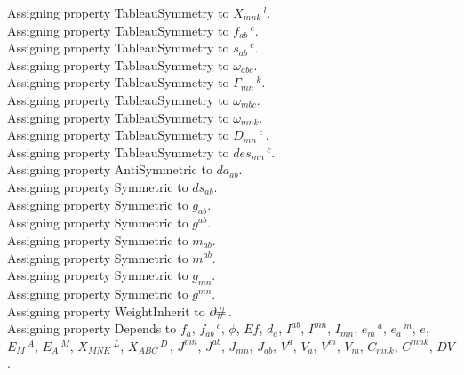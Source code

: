 \documentclass[11pt]{article}
\begin{document}
Assigning property TableauSymmetry to ${X}_{m n k}\,^{l}$.
\\
Assigning property TableauSymmetry to ${f}_{a b}\,^{c}$.
\\
Assigning property TableauSymmetry to ${s}_{a b}\,^{c}$.
\\
Assigning property TableauSymmetry to ${\omega}_{a b c}$.
\\
Assigning property TableauSymmetry to ${\Gamma}_{m n}\,^{k}$.
\\
Assigning property TableauSymmetry to ${\omega}_{m b c}$.
\\
Assigning property TableauSymmetry to ${\omega}_{m n k}$.
\\
Assigning property TableauSymmetry to ${D}_{m n}\,^{c}\, $.
\\
Assigning property TableauSymmetry to ${des}_{m n}\,^{c}$.
\\
Assigning property AntiSymmetric to ${da}_{a b}$.
\\
Assigning property Symmetric to ${ds}_{a b}$.
\\
Assigning property Symmetric to ${g}_{a b}$.
\\
Assigning property Symmetric to ${g}^{a b}$.
\\
Assigning property Symmetric to ${m}_{a b}$.
\\
Assigning property Symmetric to ${m}^{a b}$.
\\
Assigning property Symmetric to ${g}_{m n}$.
\\
Assigning property Symmetric to ${g}^{m n}$.
\\
Assigning property WeightInherit to $\partial{\#}\, $.
\\
Assigning property Depends to ${f}_{a}$, ${f}_{a b}\,^{c}$, $\phi$, $Ef$, ${d}_{a}$, ${I}^{a b}$, ${I}^{m n}$, ${I}_{m n}$, ${e}_{m}\,^{a}$, ${e}_{a}\,^{m}$, $e$, ${E}_{M}\,^{A}$, ${E}_{A}\,^{M}$, ${X}_{M N K}\,^{L}$, ${X}_{A B C}\,^{D\, }$, ${J}^{m n}$, ${J}^{a b}$, ${J}_{m n}$, ${J}_{a b}$, ${V}^{a}$, ${V}_{a}$, ${V}^{m}$, ${V}_{m}$, ${C}_{m n k}$, ${C}^{m n k}$, $DV$.
\end{document}
